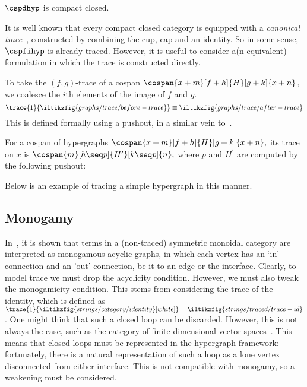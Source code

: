 \begin{corollary}
    \(\cspdhyp\) is compact closed.
\end{corollary}

It is well known that every compact closed category is equipped with a \emph{canonical trace}~\cite{joyal1996traced}, constructed by combining the cup, cap and an identity.
So in some sense, \(\cspfihyp\) is already traced.
However, it is useful to consider a(n equivalent) formulation in which the trace is constructed directly.

To take the \((f,g)\)-trace of a cospan \(\cospan{x+m}[f+h]{H}[g+k]{x+n}\), we coalesce the \(i\)th elements of the image of \(f\) and \(g\).
\[
    \trace{1}{\iltikzfig{graphs/trace/before-trace}}
    \equiv
    \iltikzfig{graphs/trace/after-trace}
\]
This is defined formally using a pushout, in a similar vein
to~\cite{dixon2013opengraphs}.

\begin{definition}
    For a cospan of hypergraphs \(
        \cospan{x+m}[f+h]{H}[g+k]{x+n},
    \) its trace on \(x\) is \(
        \cospan{m}[h \seq p]{H^\prime}[k \seq p]{n},
    \) where \(p\) and \(H^\prime\) are computed by the following pushout:
    \begin{center}
    \end{center}
\end{definition}

\begin{example}
    Below is an example of tracing a simple hypergraph in this manner.
    \begin{center}
    \end{center}
\end{example}

\subsection{Monogamy}

In~\cite{bonchi2016rewriting}, it is shown that terms in a (non-traced)
symmetric monoidal category are interpreted as monogamous acyclic graphs, in
which each vertex has an `in' connection and an 'out' connection, be it to an
edge or the interface.
Clearly, to model trace we must drop the acyclicity condition.
However, we must also tweak the monogamicity condition.
This stems from considering the trace of the identity, which is defined as
\(
    \trace{1}{\iltikzfig{strings/category/identity}[white]}
    =
    \iltikzfig{strings/traced/trace-id}
\).
One might think that such a closed loop can be discarded.
However, this is not always the case, such as the category of finite dimensional
vector spaces~\cite[Sec. 6.1]{hasegawa1997recursion}.
This means that closed loops must be represented in the hypergraph framework:
fortunately, there is a natural representation of such a loop as a lone vertex
disconnected from either interface.
This is not compatible with monogamy, so a weakening must be considered.

